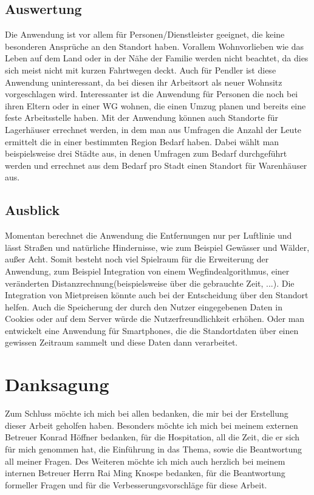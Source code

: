 \documentclass[a4paper, 12pt]{scrreprt}
\begin{document}
\section{Auswertung}
Die Anwendung ist vor allem für Personen/Dienstleister geeignet, die keine besonderen Ansprüche an den Standort haben.
Vorallem Wohnvorlieben wie das Leben auf dem Land oder in der Nähe der Familie werden nicht beachtet, da dies sich meist nicht mit kurzen Fahrtwegen deckt.
Auch für Pendler ist diese Anwendung uninteressant, da bei diesen ihr Arbeitsort als neuer Wohnsitz vorgeschlagen wird.
Interessanter ist die Anwendung für Personen die noch bei ihren Eltern oder in einer WG wohnen, die einen Umzug planen und bereits eine feste Arbeitsstelle haben.
Mit der Anwendung können auch Standorte für Lagerhäuser errechnet werden, in dem man aus Umfragen die Anzahl der Leute ermittelt die in einer bestimmten Region Bedarf haben.
Dabei wählt man beispielsweise drei Städte aus, in denen Umfragen zum Bedarf durchgeführt werden und errechnet aus dem Bedarf pro Stadt einen Standort für Warenhäuser aus.
\section{Ausblick}
Momentan berechnet die Anwendung die Entfernungen nur per Luftlinie und lässt Straßen und natürliche Hindernisse, wie zum Beispiel Gewässer und Wälder, außer Acht.
Somit besteht noch viel Spielraum für die Erweiterung der Anwendung, zum Beispiel Integration von einem Wegfindealgorithmus, einer veränderten Distanzrechnung(beispielsweise über die gebrauchte Zeit, ...).
Die Integration von Mietpreisen könnte auch bei der Entscheidung über den Standort helfen.
Auch die Speicherung der durch den Nutzer eingegebenen Daten in Cookies oder auf dem Server würde die Nutzerfreundlichkeit erhöhen. Oder man entwickelt eine Anwendung für Smartphones, die die Standortdaten über einen gewissen Zeitraum sammelt und diese Daten dann verarbeitet.


\listoffigures
{}
\chapter*{Danksagung}
Zum Schluss möchte ich mich bei allen bedanken, die mir bei der Erstellung dieser Arbeit geholfen haben.
Besonders möchte ich mich bei meinem externen Betreuer Konrad Höffner bedanken, für die Hospitation, all die Zeit, die er sich für mich genommen hat, die Einführung in das Thema, sowie die Beantwortung all meiner Fragen.   
Des Weiteren möchte ich mich auch herzlich bei meinem internen Betreuer Herrn Rai Ming Knospe bedanken, für die Beantwortung formeller Fragen und für die Verbesserungsvorschläge für diese Arbeit.
\end{document}
